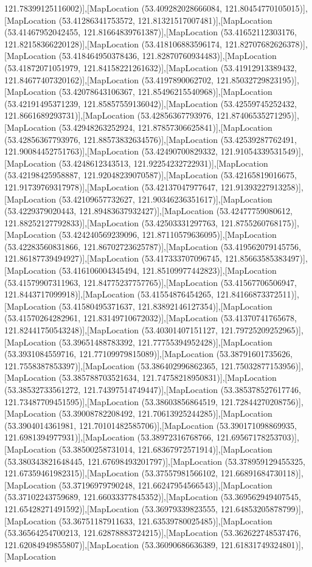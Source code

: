 121.78399125116002)],[MapLocation (53.409282028666084, 121.80454770105015)],[MapLocation (53.41286341753572, 121.81321517007481)],[MapLocation (53.41467952042455, 121.81664839761387)],[MapLocation (53.41652112303176, 121.82158366220128)],[MapLocation (53.418106883596174, 121.82707682626378)],[MapLocation (53.418464950378436, 121.82870760934483)],[MapLocation (53.41872071051979, 121.84158221261632)],[MapLocation (53.41912913389432, 121.84677407320162)],[MapLocation (53.4197890062702, 121.85032729823195)],[MapLocation (53.42078643106367, 121.85496215540968)],[MapLocation (53.42191495371239, 121.85857559136042)],[MapLocation (53.42559745252432, 121.8661689293731)],[MapLocation (53.42856367793976, 121.87406535271295)],[MapLocation (53.42948263252924, 121.87857306625841)],[MapLocation (53.42856367793976, 121.88573832634576)],[MapLocation (53.42539287762491, 121.90084452751763)],[MapLocation (53.42490700829332, 121.91054339531549)],[MapLocation (53.4248612343513, 121.92254232722931)],[MapLocation (53.42198425958887, 121.92048239070587)],[MapLocation (53.42165819016675, 121.91739769317978)],[MapLocation (53.42137047977647, 121.91393227913258)],[MapLocation (53.42109657732627, 121.90346236351617)],[MapLocation (53.4229379020443, 121.89483637932427)],[MapLocation (53.42477759080612, 121.88252127792833)],[MapLocation (53.42503331297763, 121.8755260768175)],[MapLocation (53.424240569239096, 121.87110579636095)],[MapLocation (53.42283560831866, 121.86702723625787)],[MapLocation (53.419562079145756, 121.86187739494927)],[MapLocation (53.417333707096745, 121.85663585383497)],[MapLocation (53.416106004345494, 121.85109977442823)],[MapLocation (53.41579907311963, 121.84775237757765)],[MapLocation (53.41567706506947, 121.8443717099918)],[MapLocation (53.41554876454265, 121.84166873372511)],[MapLocation (53.41580495371637, 121.83892146127354)],[MapLocation (53.41570264282961, 121.83149710672032)],[MapLocation (53.41370741765678, 121.82441750543248)],[MapLocation (53.40301407151127, 121.79725209252965)],[MapLocation (53.39651488783392, 121.77755394952428)],[MapLocation (53.3931084559716, 121.77109979815089)],[MapLocation (53.38791601735626, 121.7558387853397)],[MapLocation (53.386402996862365, 121.75032877153956)],[MapLocation (53.385788703521634, 121.74758218950831)],[MapLocation (53.38532733561272, 121.74397514749447)],[MapLocation (53.385378527617746, 121.73487709451595)],[MapLocation (53.38603856864519, 121.72844270208756)],[MapLocation (53.39008782208492, 121.70613925244285)],[MapLocation (53.3904014361981, 121.70101482585706)],[MapLocation (53.390171098869935, 121.6981394977931)],[MapLocation (53.38972316768766, 121.69567178253703)],[MapLocation (53.38500258731014, 121.68367972571914)],[MapLocation (53.380343821648445, 121.67698493201797)],[MapLocation (53.378959129455325, 121.67359461982315)],[MapLocation (53.37557981566102, 121.66891684730118)],[MapLocation (53.37196979790248, 121.66247954566543)],[MapLocation (53.37102243759689, 121.66033377845352)],[MapLocation (53.369562949407545, 121.65428271491592)],[MapLocation (53.36979339823555, 121.64853205878799)],[MapLocation (53.36751187911633, 121.63539780025485)],[MapLocation (53.36564254700213, 121.62878883724215)],[MapLocation (53.362622748537476, 121.62084949855807)],[MapLocation (53.36090686636389, 121.61831749324801)],[MapLocation 